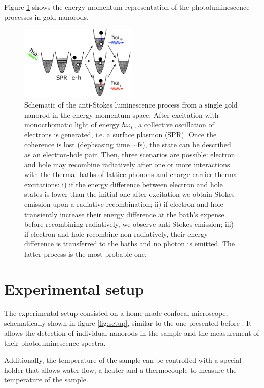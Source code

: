 \documentclass[journal=nalefd,manuscript=letter]{achemso}
\begin{document}
Figure \ref{fig:anti-Stokes-process} shows the energy-momentum representation
of the photoluminescence processes in gold nanorods. 


\begin{figure}[htp] \centering
\includegraphics[width=0.5\textwidth]{Figures/Supplementary/01_AS_Scheme/luminescence_all_AS.png}
\caption{Schematic of the anti-Stokes luminescence process from a single gold
nanorod in the energy-momentum space. 
After excitation with monocrhomatic light of energy $\hbar \omega_L$, 
a collective oscillation of electrons is generated, i.e. a surface plasmon (SPR). 
Once the coherence is lost (dephsasing time $\sim$fs), the state can be described as an
electron-hole pair. Then, three scenarios are possible: electron and hole may
recombine radiatively after one or more interactions with the thermal baths of
lattice phonons and charge carrier thermal excitations: i) if the energy
difference between electron and hole states is lower than the initial one after
excitation we obtain Stokes emission upon a radiative recombination; ii) if
electron and hole transiently increase their energy difference at the bath's
expense before recombining radiatively, we observe anti-Stokes emission; iii) if
electron and hole recombine non radiatively, their energy difference is
transferred to the baths and no photon is emitted. The latter process is the
most probable one.}
	\label{fig:anti-Stokes-process}
\end{figure}


\section{Experimental setup}\label{sec:setup}

The experimental setup consisted on a home-made confocal microscope, schematically shown in figure
\ref{fig:setup}, similar to the one presented before \cite{Carattino2016a}. It allows the detection of individual nanorods in the sample and the measurement of their photoluminescence spectra. 

Additionally, the temperature of the sample can be controlled with a special holder that allows 
water flow, a heater and a thermocouple to measure the temperature of the sample. 
\end{document}
